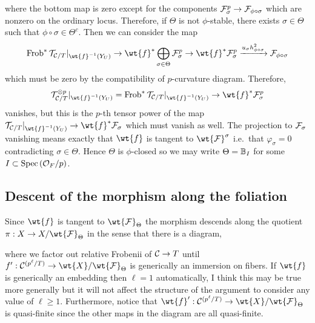 \documentclass[main.tex]{subfiles}
\begin{document}
{\begin{center}
\end{center}
where the bottom map is zero except for the components $\mathcal{F}_{\sigma}^{p} \to \mathcal{F}_{\phi \circ \sigma}$ which are nonzero on the ordinary locus. Therefore, if $\Theta$ is not $\phi$-stable, there exists $\sigma \in \Theta$ such that $\phi \circ \sigma \in \Theta^c$. Then we can consider the map
\[ \Frob^* \cT_{\cC/T} |_{\wt{f}^{-1}(Y_U)} \to \wt{f}^* \bigoplus\limits_{\sigma \in \Theta} \F_{\sigma}^{p} \to \wt{f}^* \F_{\sigma}^p \xrightarrow{u_{\sigma} h_{\phi \circ \sigma}^2} \F_{\phi \circ \sigma} \]
which must be zero by the compatibility of $p$-curvature diagram. Therefore, 
\[ \cT_{\cC/T}^{\ot p} |_{\wt{f}^{-1}(Y_U)} = \Frob^* \cT_{\cC/T} |_{\wt{f}^{-1}(Y_U)} \to \wt{f}^* \F_{\sigma}^p \] vanishes, but this is the $p$-th tensor power of the map $\cT_{\cC/T} |_{\wt{f}^{-1}(Y_U)} \to \wt{f}^* \F_{\sigma}$ which must vanish as well. The projection to $\mathcal{F}_{\sigma}$ vanishing means exactly that $\wt{f}$ is tangent to $\wt{\F}^{\sigma}$ i.e.\ that $\varphi_{\sigma} = 0$ contradicting $\sigma \in \Theta$. Hence $\Theta$ is $\phi$-closed so we may write $\Theta = \mathbb{B}_I$ for some $I \subset \operatorname{\mathrm{Spec}}{(\mathcal{O}_F / p)}$.

\subsection{Descent of the morphism along the foliation} 

Since $\wt{f}$ is tangent to $\wt{\F}_{\Theta}$ the morphism descends along the quotient $\pi : X \to X / \wt{\F}_{\Theta}$ in the sense that there is a diagram,
\begin{center}
\end{center}
where we factor out relative Frobenii of $\mathcal{C} \to T$ until $f' : \cC^{(p^{\ell}/T)} \to \wt{X} / \wt{\F}_{\Theta}$ is generically an immersion on fibers. If $\wt{f}$ is generically an embedding then $\ell = 1$ automatically, I think this may be true more generally but it will not affect the structure of the argument to consider any value of $\ell \ge 1$. Furthermore, notice that $\wt{f}' : \cC^{(p^{\ell}/T)} \to \wt{X} / \wt{\F}_{\Theta}$ is quasi-finite since the other maps in the diagram are all quasi-finite.  

}
\end{document}
